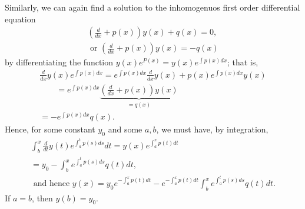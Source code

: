 Similarly, we can again find a solution to the inhomogenuos  first order differential equation
\begin{equation}
\begin{split}
\left(\frac{d}{dx} + p(x)  \right)  y(x)+ q(x)=0,      \\
\textrm{ or }\left(\frac{d }{dx}  + p(x) \right)   y(x)= - q(x)
\end{split}
\label{2011-m-ch-dseeinh}
\end{equation}
by differentiating the function $y(x)e^{P(x)}=y(x)e^{ \int p(x) dx}$;
that is,
\begin{equation}
\begin{split}
\frac{d }{dx}   y(x)e^{  \int p(x) dx} =
e^{  \int p(x) dx}\frac{d }{dx}   y(x) + p(x) e^{ \int p(x) dx}  y(x) \\
\qquad
=  e^{  \int p(x) dx}\underbrace{\left(\frac{d }{dx}    + p(x) \right)   y(x)}_{=q(x)}  \\
=   - e^{  \int p(x) dx} q(x).
\end{split}
\label{2011-m-ch-dsee1213}
\end{equation}
Hence, for some constant $y_0$ and some $a,b$,
we must have, by integration,
\begin{equation}
\begin{split}
\int_b^x \frac{d }{dt}   y(t)e^{  \int_a^t p(s) ds} dt  =
y(x)e^{  \int_a^x p(t) dt} \\
= y_0 -  \int_b^x e^{ \int_a^t p(s) ds }q(t) dt,\\
\textrm{ and hence }
y(x)= y_0e^{ - \int_a^x p(t) dt}  -  e^{ - \int_a^x p(t) dt} \int_b^x e^{ \int_a^t p(s) ds} q(t) dt
.
\end{split}
\label{2011-m-ch-dseekh}
\end{equation}
If $a=b$, then $y(b)= y_0$.

